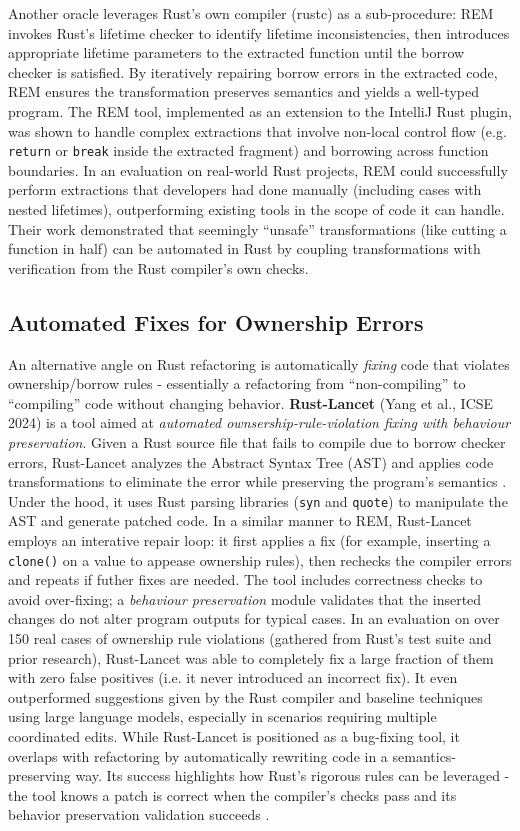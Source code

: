 Another oracle leverages Rust's own compiler (rustc) as a sub-procedure: REM
invokes Rust's lifetime checker to identify lifetime inconsistencies, then
introduces appropriate lifetime parameters to the extracted function until the
borrow checker is satisfied.  By iteratively repairing borrow errors in the
extracted code, REM ensures the transformation preserves semantics and yields a
well-typed program. The REM tool, implemented as an extension to the IntelliJ
Rust plugin, was shown to handle complex extractions that involve non-local
control flow (e.g. \texttt{return} or \texttt{break} inside the extracted fragment) and borrowing
across function boundaries. In an evaluation on real-world Rust projects, REM
could successfully perform extractions that developers had done manually
(including cases with nested lifetimes), outperforming existing tools in the
scope of code it can handle. Their work demonstrated that seemingly ``unsafe''
transformations (like cutting a function in half) can be automated in Rust by
coupling transformations with verification from the Rust compiler's own checks.

\subsection{Automated Fixes for Ownership Errors}
An alternative angle on Rust refactoring is automatically \textit{fixing} code that
violates ownership/borrow rules - essentially a refactoring from
``non-compiling'' to ``compiling'' code without changing behavior.
\textbf{Rust-Lancet} (Yang et al., ICSE 2024) is a tool aimed at
\textit{automated ownsership-rule-violation fixing with behaviour preservation}.
Given a Rust source file that fails to compile due to borrow checker errors,
Rust-Lancet analyzes the Abstract Syntax Tree (AST) and applies code transformations
to eliminate the error while preserving the program's semantics
\cite{RustLancet}. Under the hood, it uses Rust parsing libraries (\texttt{syn} and
\texttt{quote}) to manipulate the AST and generate patched code. In a similar
manner to REM, Rust-Lancet employs an interative repair loop: it first applies a
fix (for example, inserting a \texttt{clone()} on a value to appease ownership
rules), then rechecks the compiler errors and repeats if futher fixes are
needed. The tool includes correctness checks to avoid over-fixing; a
\textit{behaviour preservation} module validates that the inserted changes do
not alter program outputs for typical cases.  In an evaluation on over 150 real
cases of ownership rule violations (gathered from Rust's test suite and prior
research), Rust-Lancet was able to completely fix a large fraction of them with
zero false positives (i.e. it never introduced an incorrect fix). It even
outperformed suggestions given by the Rust compiler and baseline techniques
using large language models, especially in scenarios requiring multiple
coordinated edits. While Rust-Lancet is positioned as a bug-fixing tool, it
overlaps with refactoring by automatically rewriting code in a
semantics-preserving way. Its success highlights how Rust's rigorous rules can
be leveraged - the tool knows a patch is correct when the compiler's checks pass
and its behavior preservation validation succeeds \cite{RustLancet}.

